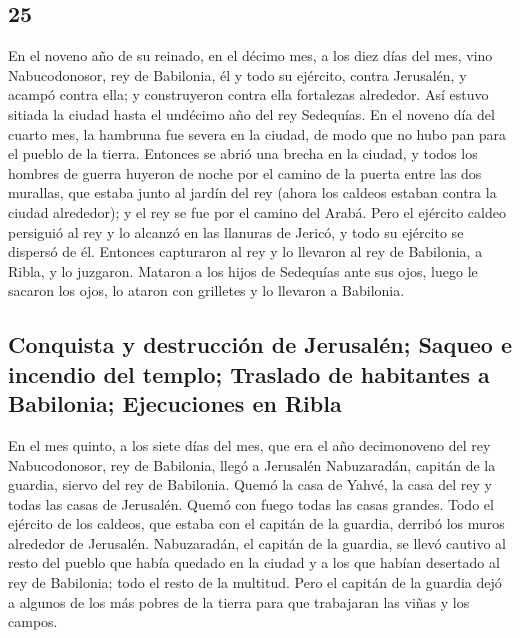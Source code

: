\begin{paracol}{2}
\hypertarget{section-48}{%
\section{25}\label{section-48}}

 En el noveno año de su reinado, en el décimo mes, a los
diez días del mes, vino Nabucodonosor, rey de Babilonia, él y todo su
ejército, contra Jerusalén, y acampó contra ella; y construyeron contra
ella fortalezas alrededor.  Así estuvo sitiada la ciudad
hasta el undécimo año del rey Sedequías.  En el noveno día
del cuarto mes, la hambruna fue severa en la ciudad, de modo que no hubo
pan para el pueblo de la tierra.  Entonces se abrió una
brecha en la ciudad, y todos los hombres de guerra huyeron de noche por
el camino de la puerta entre las dos murallas, que estaba junto al
jardín del rey (ahora los caldeos estaban contra la ciudad alrededor); y
el rey se fue por el camino del Arabá.  Pero el ejército
caldeo persiguió al rey y lo alcanzó en las llanuras de Jericó, y todo
su ejército se dispersó de él.  Entonces capturaron al rey
y lo llevaron al rey de Babilonia, a Ribla, y lo juzgaron.
 Mataron a los hijos de Sedequías ante sus ojos, luego le
sacaron los ojos, lo ataron con grilletes y lo llevaron a Babilonia.

\hypertarget{conquista-y-destrucciuxf3n-de-jerusaluxe9n-saqueo-e-incendio-del-templo-traslado-de-habitantes-a-babilonia-ejecuciones-en-ribla}{%
\subsection{Conquista y destrucción de Jerusalén; Saqueo e incendio del
templo; Traslado de habitantes a Babilonia; Ejecuciones en
Ribla}\label{conquista-y-destrucciuxf3n-de-jerusaluxe9n-saqueo-e-incendio-del-templo-traslado-de-habitantes-a-babilonia-ejecuciones-en-ribla}}

 En el mes quinto, a los siete días del mes, que era el
año decimonoveno del rey Nabucodonosor, rey de Babilonia, llegó a
Jerusalén Nabuzaradán, capitán de la guardia, siervo del rey de
Babilonia.  Quemó la casa de Yahvé, la casa del rey y
todas las casas de Jerusalén. Quemó con fuego todas las casas grandes.
 Todo el ejército de los caldeos, que estaba con el
capitán de la guardia, derribó los muros alrededor de Jerusalén.
 Nabuzaradán, el capitán de la guardia, se llevó cautivo
al resto del pueblo que había quedado en la ciudad y a los que habían
desertado al rey de Babilonia; todo el resto de la multitud.
 Pero el capitán de la guardia dejó a algunos de los más
pobres de la tierra para que trabajaran las viñas y los campos.


\end{paracol}
